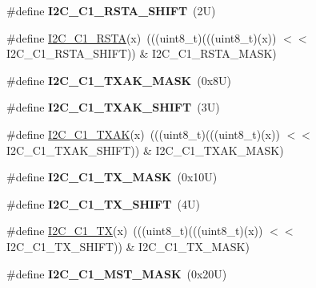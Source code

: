 \begin{DoxyCompactItemize}
\#define {\bfseries I2\+C\+\_\+\+C1\+\_\+\+R\+S\+T\+A\+\_\+\+S\+H\+I\+FT}~(2\+U)
\item 
\#define \mbox{\hyperlink{group___i2_c___register___masks_ga31b0a3b7726742ff59778fbccb84dd28}{I2\+C\+\_\+\+C1\+\_\+\+R\+S\+TA}}(x)~(((uint8\+\_\+t)(((uint8\+\_\+t)(x)) $<$$<$ I2\+C\+\_\+\+C1\+\_\+\+R\+S\+T\+A\+\_\+\+S\+H\+I\+FT)) \& I2\+C\+\_\+\+C1\+\_\+\+R\+S\+T\+A\+\_\+\+M\+A\+SK)
\item 
\mbox{\label{group___i2_c___register___masks_gaebf88a6e1a433272e606980474b4e577}} 
\#define {\bfseries I2\+C\+\_\+\+C1\+\_\+\+T\+X\+A\+K\+\_\+\+M\+A\+SK}~(0x8\+U)
\item 
\mbox{\label{group___i2_c___register___masks_ga95ea65244938ce40ca695f5193268357}} 
\#define {\bfseries I2\+C\+\_\+\+C1\+\_\+\+T\+X\+A\+K\+\_\+\+S\+H\+I\+FT}~(3\+U)
\item 
\#define \mbox{\hyperlink{group___i2_c___register___masks_ga1105e55df739d9220eb67be155865d76}{I2\+C\+\_\+\+C1\+\_\+\+T\+X\+AK}}(x)~(((uint8\+\_\+t)(((uint8\+\_\+t)(x)) $<$$<$ I2\+C\+\_\+\+C1\+\_\+\+T\+X\+A\+K\+\_\+\+S\+H\+I\+FT)) \& I2\+C\+\_\+\+C1\+\_\+\+T\+X\+A\+K\+\_\+\+M\+A\+SK)
\item 
\mbox{\label{group___i2_c___register___masks_gaf2c2222f863ed79996904cac957fbcf2}} 
\#define {\bfseries I2\+C\+\_\+\+C1\+\_\+\+T\+X\+\_\+\+M\+A\+SK}~(0x10\+U)
\item 
\mbox{\label{group___i2_c___register___masks_ga4785c943be6e7664aad1f3166c54c07c}} 
\#define {\bfseries I2\+C\+\_\+\+C1\+\_\+\+T\+X\+\_\+\+S\+H\+I\+FT}~(4\+U)
\item 
\#define \mbox{\hyperlink{group___i2_c___register___masks_ga3cf0fe9237b0694a666d258ce536b1ea}{I2\+C\+\_\+\+C1\+\_\+\+TX}}(x)~(((uint8\+\_\+t)(((uint8\+\_\+t)(x)) $<$$<$ I2\+C\+\_\+\+C1\+\_\+\+T\+X\+\_\+\+S\+H\+I\+FT)) \& I2\+C\+\_\+\+C1\+\_\+\+T\+X\+\_\+\+M\+A\+SK)
\item 
\mbox{\label{group___i2_c___register___masks_ga4c4f11999967dae4bcf93fcefda51ebe}} 
\#define {\bfseries I2\+C\+\_\+\+C1\+\_\+\+M\+S\+T\+\_\+\+M\+A\+SK}~(0x20\+U)
\item 
\mbox{\label{group___i2_c___register___masks_ga3d36bee9f6ccbd3cd27355c481eb35fc}} 
$$
\end{DoxyCompactItemize}
